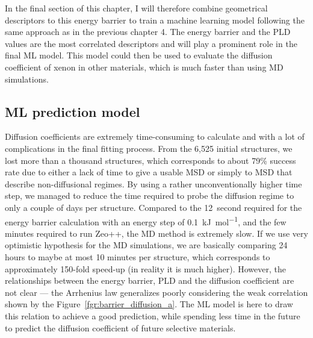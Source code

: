 \documentclass[main]{subfiles}
\begin{document}
In the final section of this chapter, I will therefore combine geometrical descriptors to this energy barrier to train a machine learning model following the same approach as in the previous chapter 4. The energy barrier and the PLD values are the most correlated descriptors and will play a prominent role in the final ML model. This model could then be used to evaluate the diffusion coefficient of xenon in other materials, which is much faster than using MD simulations.

\subsection{ML prediction model}

Diffusion coefficients are extremely time-consuming to calculate and with a lot of complications in the final fitting process. From the 6,525 initial structures, we lost more than a thousand structures, which corresponds to about 79\% success rate due to either a lack of time to give a usable MSD or simply to MSD that describe non-diffusional regimes. By using a rather unconventionally higher time step, we managed to reduce the time required to probe the diffusion regime to only a couple of days per structure. Compared to the \SI{12}{second} required for the energy barrier calculation with an energy step of \SI{0.1}{\kJ\per\mol}, and the few minutes required to run Zeo++, the MD method is extremely slow. If we use very optimistic hypothesis for the MD simulations, we are basically comparing 24 hours to maybe at most 10 minutes per structure, which corresponds to approximately 150-fold speed-up (in reality it is much higher). However, the relationships between the energy barrier, PLD and the diffusion coefficient are not clear --- the Arrhenius law generalizes poorly considering the weak correlation shown by the Figure~\ref{fgr:barrier_diffusion_a}. The ML model is here to draw this relation to achieve a good prediction, while spending less time in the future to predict the diffusion coefficient of future selective materials.
\end{document}
